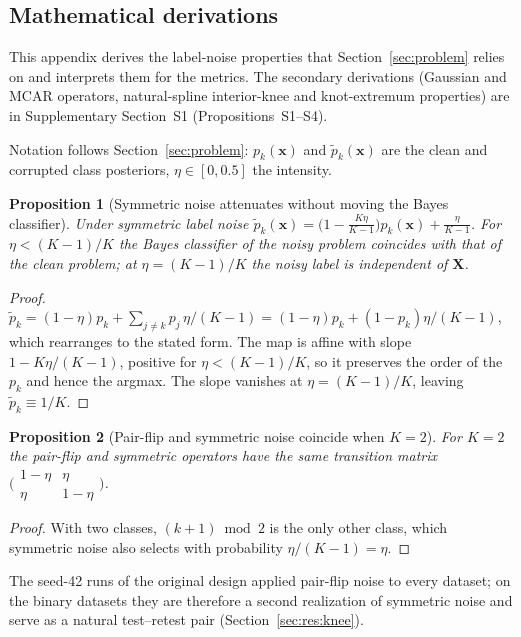 \documentclass[pdflatex,sn-mathphys]{sn-jnl}
\theoremstyle{thmstyleone}
\newtheorem{appproposition}{Proposition}
\theoremstyle{thmstyletwo}
\theoremstyle{thmstylethree}
\begin{document}
\renewcommand{\bibfont}{\footnotesize}\setlength{\bibsep}{0pt}


\begin{appendices}

\section{Mathematical derivations}\label{app:math}
This appendix derives the label-noise properties that Section~\ref{sec:problem} relies on and interprets them for the metrics. The secondary derivations (Gaussian and MCAR operators, natural-spline interior-knee and knot-extremum properties) are in Supplementary Section~S1 (Propositions~S1--S4).

Notation follows Section~\ref{sec:problem}: $p_k(\mathbf{x})$ and $\tilde p_k(\mathbf{x})$ are the clean and corrupted class posteriors, $\eta\in[0,0.5]$ the intensity.

\begin{appproposition}[Symmetric noise attenuates without moving the Bayes classifier]\label{prop:a_symmetric}
Under symmetric label noise $\tilde{p}_k(\mathbf{x})=\bigl(1-\frac{K\eta}{K-1}\bigr)p_k(\mathbf{x})+\frac{\eta}{K-1}$. For $\eta<(K-1)/K$ the Bayes classifier of the noisy problem coincides with that of the clean problem; at $\eta=(K-1)/K$ the noisy label is independent of $\mathbf{X}$.
\end{appproposition}
\begin{proof}
$\tilde{p}_k=(1-\eta)p_k+\sum_{j\ne k}p_j\,\eta/(K-1)=(1-\eta)p_k+(1-p_k)\eta/(K-1)$, which rearranges to the stated form. The map is affine with slope $1-K\eta/(K-1)$, positive for $\eta<(K-1)/K$, so it preserves the order of the $p_k$ and hence the argmax. The slope vanishes at $\eta=(K-1)/K$, leaving $\tilde{p}_k\equiv 1/K$.
\end{proof}

\begin{appproposition}[Pair-flip and symmetric noise coincide when $K=2$]\label{prop:a_pairflip_binary}
For $K=2$ the pair-flip and symmetric operators have the same transition matrix $\bigl(\begin{smallmatrix}1-\eta&\eta\\ \eta&1-\eta\end{smallmatrix}\bigr)$.
\end{appproposition}
\begin{proof}
With two classes, $(k+1)\bmod 2$ is the only other class, which symmetric noise also selects with probability $\eta/(K-1)=\eta$.
\end{proof}
The seed-42 runs of the original design applied pair-flip noise to every dataset; on the binary datasets they are therefore a second realization of symmetric noise and serve as a natural test--retest pair (Section~\ref{sec:res:knee}).


\end{appendices}
\end{document}

